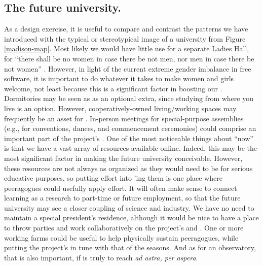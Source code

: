 \subsection{The future university.}
As a design exercise, it is useful to compare and contrast the
patterns we have introduced with the typical or stereotypical image of
a university from Figure \ref{madison-map}.  Most likely we would have
little use for a separate Ladies Hall, for ``there shall be no women
in case there be not men, nor men in case there be not women''
\cite[Chapter 1.LII]{rabelais1894gargantua}.  However, in light of the
current extreme gender imbalance in free software, it is important to
do whatever it takes to make women and girls welcome, not least
because this is a significant factor in boosting our
.  Dormitories may be seen as as an
optional extra, since studying from where you live is an option.
However, cooperatively-owned living/working spaces may frequently be
an asset for .  In-person meetings for
special-purpose assemblies (e.g., for conventions, dances, and
commencement ceremonies) could comprise an important part of the
project's .  One of the most noticeable things
about ``now'' is that we have a vast array of resources available
online.  Indeed, this may be the most significant factor in making the
future university conceivable.  However, these resources are not
always as organized as they would need to be for serious educative
purposes, so putting effort into 'ing them is one place where peeragogues could usefully
apply effort.  It will often make sense to connect learning as a
research  to part-time or future employment, so
that the future university may see a closer coupling of science and
industry.  We have no need to maintain a special president's
residence, although it would be nice to have a place to throw parties
and work collaboratively on the project's  and
.  One or more working farms could be useful to
help physically sustain peeragogues, while putting the project's
 in tune with that of the seasons.  And as for
an observatory, that is also important, if  is
truly to reach \emph{ad astra, per aspera}.


  

